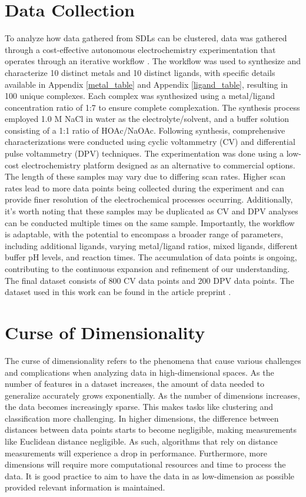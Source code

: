 \section{Data Collection}
To analyze how data gathered from SDLs can be clustered, data was gathered through a cost-effective autonomous electrochemistry experimentation that operates through an iterative workflow \cite{PabloGarca2024}. The workflow was used to synthesize and characterize 10 distinct metals and 10 distinct ligands, with specific details available in Appendix \ref{metal_table} and Appendix \ref{ligand_table}, resulting in 100 unique complexes. Each complex was synthesized using a metal/ligand concentration ratio of 1:7 to ensure complete complexation. The synthesis process employed 1.0 M NaCl in water as the electrolyte/solvent, and a buffer solution consisting of a 1:1 ratio of HOAc/NaOAc. Following synthesis, comprehensive characterizations were conducted using cyclic voltammetry (CV) and differential pulse voltammetry (DPV) techniques. The experimentation was done using a low-cost electrochemistry platform designed as an alternative to commercial options. The length of these samples may vary due to differing scan rates. Higher scan rates lead to more data points being collected during the experiment and can provide finer resolution of the electrochemical processes occurring. Additionally, it's worth noting that these samples may be duplicated as CV and DPV analyses can be conducted multiple times on the same sample. Importantly, the workflow is adaptable, with the potential to encompass a broader range of parameters, including additional ligands, varying metal/ligand ratios, mixed ligands, different buffer pH levels, and reaction times. The accumulation of data points is ongoing, contributing to the continuous expansion and refinement of our understanding. The final dataset consists of 800 CV data points and 200 DPV data points. The dataset used in this work can be found in the article preprint \cite{PabloGarca2024}.
\section{Curse of Dimensionality}
The curse of dimensionality refers to the phenomena that cause various challenges and complications when analyzing data in high-dimensional spaces. As the number of features in a dataset increases, the amount of data needed to generalize accurately grows exponentially. As the number of dimensions increases, the data becomes increasingly sparse. This makes tasks like clustering and classification more challenging. In higher dimensions, the difference between distances between data points starts to become negligible, making measurements like Euclidean distance negligible. As such, algorithms that rely on distance measurements will experience a drop in performance. Furthermore, more dimensions will require more computational resources and time to process the data. It is good practice to aim to have the data in as low-dimension as possible provided relevant information is maintained. 
